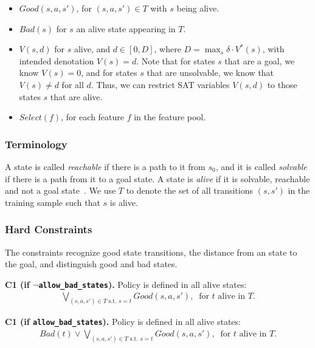 \documentclass[a4paper]{article}
\newcommand{\smallpar}[1]{{\vspace{10pt}\noindent \bf #1.}}
\newcommand{\badtx}{\ensuremath{\mathrm{BAD}}}
\begin{document}
\begin{itemize}
 \item $Good(s, a, s')$, for $(s, a, s') \in T$ with $s$ being alive.

 \item $Bad(s)$ for $s$ an alive state appearing in $T$.


 \item $V(s, d)$ for $s$ alive, and $d \in [0, D]$, where $D = \max_{s} \delta \cdot V^*(s)$,
 with intended denotation $V(s)=d$.
 Note that for states $s$ that are a goal, we know $V(s)=0$,
 and for states $s$ that are unsolvable, we know that $V(s) \neq d$ for all $d$.
 Thus, we can restrict SAT variables $V(s, d)$ to those states $s$ that are alive.

 \item $Select(f)$, for each feature $f$ in the feature pool.
\end{itemize}


\subsubsection{Terminology}

A state is called \emph{reachable} if there is a path to it from $s_0$, and it is called \emph{solvable} if there is a path from it to a goal state. A state is \emph{alive} if it is solvable, reachable and not a goal state~\cite{frances-et-al-ijcai2019}. We use $T$ to denote the set of all transitions $(s, s')$ in the training sample such that $s$ is alive.


\subsubsection{Hard Constraints}

The constraints recognize good state transitions, the distance from an state to the goal, and distinguish good and bad states.

\smallpar{C1 (if $\neg$\texttt{allow\_bad\_states})}
Policy is defined in all alive states:
\begin{align*}
\bigvee_{(s, a, s') \in T \text{ s.t. } s=t} Good(s, a, s'), \;\; \text{for $t$ alive in $T$.}
\end{align*}

\smallpar{C1 (if \texttt{allow\_bad\_states})}
Policy is defined in all alive states:
\begin{align*}
Bad(t) \lor \bigvee_{(s, a, s') \in T \text{ s.t. } s=t} Good(s, a, s'), \;\; \text{for $t$ alive in $T$.}
\end{align*}
\end{document}
